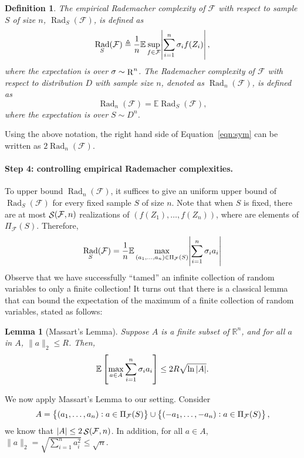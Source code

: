 \documentclass{article}
\newtheorem{lemma}{Lemma}
\newtheorem{definition}{Definition}
\DeclareMathOperator{\Rad}{{\mathrm{Rad}}}
\DeclareMathOperator*{\R}{{\rm R}}
\DeclareMathOperator*{\Scal}{{\cal S}}
\newcommand{\RR}{\mathbb{R}} %
\newcommand{\EE}{\mathbb{E}}
\newcommand{\Fcal}{\mathcal{F}}
\newcommand{\defeq}{\triangleq}
\begin{document}
\begin{definition}
The empirical Rademacher complexity of $\Fcal$ with respect to sample $S$ of size $n$, $\Rad_S(\Fcal)$, is defined as
\[ \Rad_S(\Fcal) \defeq \frac{1}{n} \EE \sup_{f \in \Fcal} \abs{\sum_{i=1}^n \sigma_i f(Z_i)}, \]
where the expectation is over $\sigma \sim \R^n$.
The Rademacher complexity of $\Fcal$ with respect to distribution $D$ with sample size $n$, denoted as $\Rad_n(\Fcal)$, is defined as
\[ \Rad_n(\Fcal) = \EE \Rad_S(\Fcal), \]
where the expectation is over $S \sim D^n$.
\end{definition}

Using the above notation, the right hand side of Equation~\eqref{eqn:sym} can be written as $2\Rad_n(\Fcal)$.

\paragraph{Step 4: controlling empirical Rademacher complexities.}
To upper bound $\Rad_n(\Fcal)$, it suffices to give an uniform upper bound of $\Rad_S(\Fcal)$ for every fixed sample $S$ of size $n$.
Note that when $S$ is fixed, there are at most $\Scal(\Fcal, n)$ realizations of
$(f(Z_1), \ldots, f(Z_n))$, where are elements of $\Pi_\Fcal(S)$. Therefore,
\[ \Rad_S(\Fcal) = \frac{1}{n} \EE \max_{(a_1,\ldots,a_n) \in \Pi_\Fcal(S)} \abs{\sum_{i=1}^n \sigma_i a_i} \]
Observe that we have successfully ``tamed'' an infinite collection of random variables to only a finite collection! It turns out that there is a classical lemma that can bound the expectation of the maximum of a finite collection of random variables, stated as follows:

\begin{lemma}[Massart's Lemma]
Suppose $A$ is a finite subset of $\RR^n$, and for all $a$ in $A$, $\|a\|_2 \leq R$. Then,
\[ \EE \sbr{\max_{a \in A} \sum_{i=1}^n \sigma_i a_i} \leq 2 R \sqrt{\ln|A|}. \]
\label{lem:massart}
\end{lemma}

We now apply Massart's Lemma to our setting. Consider
\[ A = \cbr{(a_1,\ldots,a_n): a \in \Pi_\Fcal(S)} \cup \cbr{(-a_1,\ldots,-a_n): a \in \Pi_\Fcal(S)}, \]
we know that $|A| \leq 2 \Scal(\Fcal, n)$. In addition, for all $a \in A$, $\|a\|_2 = \sqrt{\sum_{i=1}^n a_i^2} \leq \sqrt{n}$.
\end{document}
